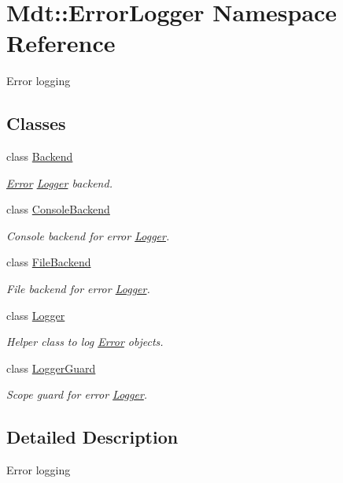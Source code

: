 \hypertarget{namespace_mdt_1_1_error_logger}{}\section{Mdt\+:\+:Error\+Logger Namespace Reference}
\label{namespace_mdt_1_1_error_logger}


Error logging  


\subsection*{Classes}
\begin{DoxyCompactItemize}
\item 
class \hyperlink{class_mdt_1_1_error_logger_1_1_backend}{Backend}
\begin{DoxyCompactList}\small\item\em \hyperlink{class_mdt_1_1_error}{Error} \hyperlink{class_mdt_1_1_error_logger_1_1_logger}{Logger} backend. \end{DoxyCompactList}\item 
class \hyperlink{class_mdt_1_1_error_logger_1_1_console_backend}{Console\+Backend}
\begin{DoxyCompactList}\small\item\em Console backend for error \hyperlink{class_mdt_1_1_error_logger_1_1_logger}{Logger}. \end{DoxyCompactList}\item 
class \hyperlink{class_mdt_1_1_error_logger_1_1_file_backend}{File\+Backend}
\begin{DoxyCompactList}\small\item\em File backend for error \hyperlink{class_mdt_1_1_error_logger_1_1_logger}{Logger}. \end{DoxyCompactList}\item 
class \hyperlink{class_mdt_1_1_error_logger_1_1_logger}{Logger}
\begin{DoxyCompactList}\small\item\em Helper class to log \hyperlink{class_mdt_1_1_error}{Error} objects. \end{DoxyCompactList}\item 
class \hyperlink{class_mdt_1_1_error_logger_1_1_logger_guard}{Logger\+Guard}
\begin{DoxyCompactList}\small\item\em Scope guard for error \hyperlink{class_mdt_1_1_error_logger_1_1_logger}{Logger}. \end{DoxyCompactList}\end{DoxyCompactItemize}


\subsection{Detailed Description}
Error logging 
